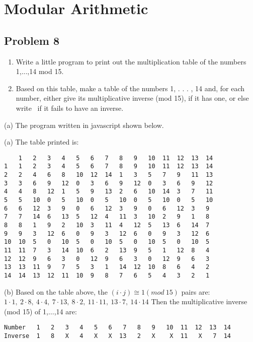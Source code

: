 \documentclass[paper=a4, fontsize=11pt]{scrartcl} %
\newcommand{\xmark}{\ding{55}}%
\numberwithin{equation}{section} %
\numberwithin{figure}{section} %
\numberwithin{table}{section} %
\newcommand{\problem}[1]{\subsection *{Problem #1}}
\begin{document}
\section {Modular Arithmetic}
\problem 8
\renewcommand{\labelenumi}{(\alph{enumi})}
\begin{enumerate}
  \item Write a little program to print out the multiplication table of the numbers {1,...,14} mod 15.
  \item Based on this table, make a table of the numbers 1, . . . , 14 and, for each number, either give its multiplicative inverse (mod 15), if it has one, or else write \xmark \ if it fails to have an inverse.
\end{enumerate}
(a) The program written in javascript shown below.


(a) The table printed is:
\begin{lstlisting}
    1   2   3   4   5   6   7   8   9   10  11  12  13  14
1   1   2   3   4   5   6   7   8   9   10  11  12  13  14
2   2   4   6   8   10  12  14  1   3   5   7   9   11  13
3   3   6   9   12  0   3   6   9   12  0   3   6   9   12
4   4   8   12  1   5   9   13  2   6   10  14  3   7   11
5   5   10  0   5   10  0   5   10  0   5   10  0   5   10
6   6   12  3   9   0   6   12  3   9   0   6   12  3   9
7   7   14  6   13  5   12  4   11  3   10  2   9   1   8
8   8   1   9   2   10  3   11  4   12  5   13  6   14  7
9   9   3   12  6   0   9   3   12  6   0   9   3   12  6
10  10  5   0   10  5   0   10  5   0   10  5   0   10  5
11  11  7   3   14  10  6   2   13  9   5   1   12  8   4
12  12  9   6   3   0   12  9   6   3   0   12  9   6   3
13  13  11  9   7   5   3   1   14  12  10  8   6   4   2
14  14  13  12  11  10  9   8   7   6   5   4   3   2   1
\end{lstlisting}

(b) Based on the table above, the $(i \cdot j) \cong 1 (mod\ 15)$ pairs are:\\
$1 \cdot 1,\ 2 \cdot 8,\ 4 \cdot 4,\ 7 \cdot 13,\ 8 \cdot 2,\ 11 \cdot 11,\ 13 \cdot 7,\ 14 \cdot 14$
Then the multiplicative inverse (mod 15) of 1,$\dots$,14 are:

\begin{lstlisting}
Number   1   2   3   4   5   6   7   8   9   10  11  12  13  14
Inverse  1   8   X   4   X   X  13   2   X    X  11   X   7  14
\end{lstlisting}
\end{document}

